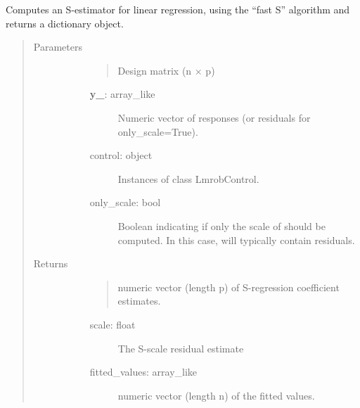 \documentclass[letterpaper,10pt,english]{sphinxmanual}
\begin{document}
\begin{fulllineitems}
\label{\detokenize{_modules/lmrob:lmrob.lmrob_S}}
Computes an S-estimator for linear regression, using the “fast S” algorithm and
returns a dictionary object.
\begin{quote}\begin{description}
\item[{Parameters}] \leavevmode\begin{description}
\item[{}] \leavevmode\begin{quote}

Design matrix (n × p)
\end{quote}
\begin{description}
\item[{{\color{red}\bfseries{}y\_}: array\_like}] \leavevmode
Numeric vector of responses (or residuals for only\_scale=True).

\item[{control: object}] \leavevmode
Instances of class LmrobControl.

\item[{only\_scale: bool}] \leavevmode
Boolean indicating if only the scale of  should be computed. In this case, 
will typically contain residuals.

\end{description}

\end{description}

\item[{Returns}] \leavevmode\begin{description}
\item[{}] \leavevmode\begin{quote}

numeric vector (length p) of S-regression coefficient estimates.
\end{quote}
\begin{description}
\item[{scale: float}] \leavevmode
The S-scale residual estimate

\item[{fitted\_values: array\_like}] \leavevmode
numeric vector (length n) of the fitted values.


\end{description}
\end{description}
\end{description}
\end{quote}
\end{fulllineitems}
\end{document}
